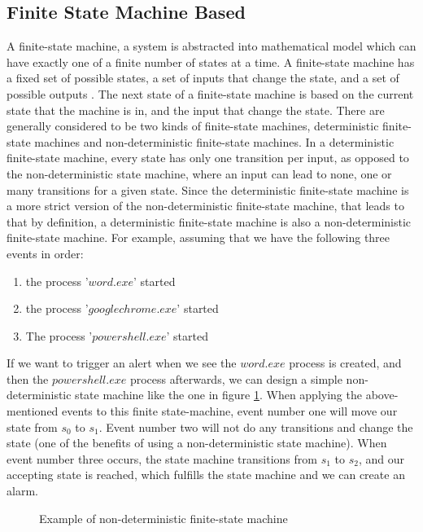 \subsection{Finite State Machine Based}
A finite-state machine, a system is abstracted into mathematical model which can have exactly one of a finite number of states at a time. A finite-state machine has a fixed set of possible states, a set of inputs that change the state, and a set of possible outputs \cite{keller_2001}.
The next state of a finite-state machine is based on the current state that the machine is in, and the input that change the state.
There are generally considered to be two kinds of finite-state machines, deterministic finite-state machines and non-deterministic finite-state machines. In a deterministic finite-state machine, every state has only one transition per input, as opposed to the non-deterministic state machine, where an input can lead to none, one or many transitions for a given state. Since the deterministic finite-state machine is a more strict version of the non-deterministic finite-state machine, that leads to that by definition, a deterministic finite-state machine is also a non-deterministic finite-state machine.
For example, assuming that we have the following three events in order:
\begin{enumerate}
    \item the process '$word.exe$' started
    \item the process '$googlechrome.exe$' started
    \item The process '$powershell.exe$' started
\end{enumerate}
If we want to trigger an alert when we see the $word.exe$ process is created, and then the $powershell.exe$ process afterwards, we can design a simple non-deterministic state machine like the one in figure \ref{fig:finite-state-machine}. When applying the above-mentioned events to this finite state-machine, event number one will move our state from $s_0$ to $s_1$. Event number two will not do any transitions and change the state (one of the benefits of using a non-deterministic state machine). When event number three occurs, the state machine transitions from $s_1$ to $s_2$, and our accepting state is reached, which fulfills the state machine and we can create an alarm.
\begin{figure}[ht]
\centering
{}
\caption{Example of non-deterministic finite-state machine}
\label{fig:finite-state-machine}
\end{figure}
